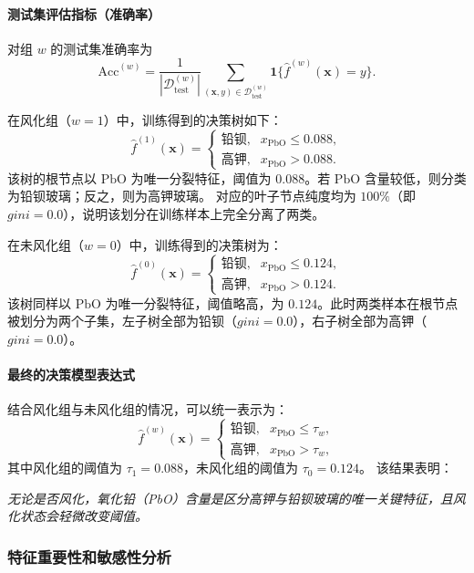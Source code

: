 \documentclass[withoutpreface,bwprint]{cumcmthesis}
\begin{document}
\paragraph{测试集评估指标（准确率）}
对组 $w$ 的测试集准确率为
\[
\mathrm{Acc}^{(w)}=\frac{1}{|\mathcal{D}^{(w)}_{\mathrm{test}}|}
\sum_{(\mathbf{x},y)\in\mathcal{D}^{(w)}_{\mathrm{test}}}
\mathbf{1}\{\hat{f}^{(w)}(\mathbf{x})=y\}.
\]

在风化组（$w=1$）中，训练得到的决策树如下：  
\[
\hat f^{(1)}(\mathbf{x})=
\begin{cases}
\text{铅钡}, & x_{\mathrm{PbO}}\le 0.088,\\[6pt]
\text{高钾}, & x_{\mathrm{PbO}}> 0.088.
\end{cases}
\]
该树的根节点以 $\mathrm{PbO}$ 为唯一分裂特征，阈值为 $0.088$。若 $\mathrm{PbO}$ 含量较低，则分类为铅钡玻璃；反之，则为高钾玻璃。  
对应的叶子节点纯度均为 $100\%$（即 $gini=0.0$），说明该划分在训练样本上完全分离了两类。  

在未风化组（$w=0$）中，训练得到的决策树为：
\[
\hat f^{(0)}(\mathbf{x})=
\begin{cases}
\text{铅钡}, & x_{\mathrm{PbO}}\le 0.124,\\[6pt]
\text{高钾}, & x_{\mathrm{PbO}}> 0.124.
\end{cases}
\]
该树同样以 $\mathrm{PbO}$ 为唯一分裂特征，阈值略高，为 $0.124$。此时两类样本在根节点被划分为两个子集，左子树全部为铅钡（$gini=0.0$），右子树全部为高钾（$gini=0.0$）。  

\paragraph{最终的决策模型表达式}

结合风化组与未风化组的情况，可以统一表示为：
\[
\hat f^{(w)}(\mathbf{x})=
\begin{cases}
\text{铅钡}, & x_{\mathrm{PbO}}\le \tau_w,\\[6pt]
\text{高钾}, & x_{\mathrm{PbO}}> \tau_w,
\end{cases}
\]
其中风化组的阈值为 $\tau_1=0.088$，未风化组的阈值为 $\tau_0=0.124$。  
该结果表明：

\emph{无论是否风化，氧化铅（PbO）含量是区分高钾与铅钡玻璃的唯一关键特征，且风化状态会轻微改变阈值。}

\subsubsection{特征重要性和敏感性分析}
\end{document}
